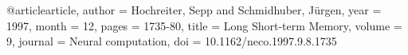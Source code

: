 @article{article,
author = {Hochreiter, Sepp and Schmidhuber, Jürgen},
year = {1997},
month = {12},
pages = {1735-80},
title = {Long Short-term Memory},
volume = {9},
journal = {Neural computation},
doi = {10.1162/neco.1997.9.8.1735}
}